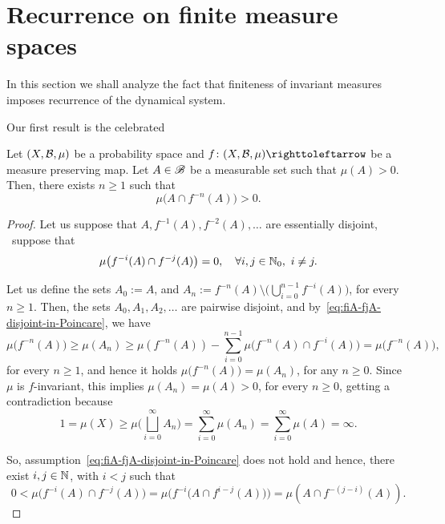 \section{Recurrence on finite measure spaces}\label{sec:recurrence-Poincare}

In this section we shall analyze the fact that finiteness of invariant measures imposes recurrence of the dynamical system.

Our first result is the celebrated

\begin{theorem}\label{thm:poincare-recurrence-v-return-sets-for-1-time}
  Let $(X,\mathcal{B},\mu)$ be a probability space and $f\colon (X,\mc{B},\mu)\carr$ be a measure preserving map. Let $A\in\mathscr{B}$ be a measurable set such that $\mu(A)>0$. Then, there exists $n\geq 1$ such that
  \begin{displaymath}
    \mu\big(A\cap f^{-n}(A)\big)>0.
  \end{displaymath}
\end{theorem}

\begin{proof}
  Let us suppose that $A,f^{-1}(A),f^{-2}(A),\ldots$ are essentially disjoint, \ie~suppose that
  \begin{equation}
    \label{eq:fiA-fjA-disjoint-in-Poincare}
    \mu\big(f^{-i}(A)\cap f^{-j}(A)\big)=0, \quad\forall i,j\in\N_{0},\ i\neq j.
  \end{equation}

  Let us define the sets $A_{0}:=A$, and $A_{n}:=f^{-n}(A)\setminus \Big(\bigcup_{i=0}^{n-1} f^{-i}(A)\Big)$, for every $n\geq 1$. Then, the sets $A_{0},A_{1},A_{2},\ldots$ are pairwise disjoint, and by~\eqref{eq:fiA-fjA-disjoint-in-Poincare}, we have
  \begin{displaymath}
    \mu\big(f^{-n}(A)\big)\geq \mu(A_{n})\geq \mu(f^{-n}(A)) - \sum_{i=0}^{n-1} \mu\big(f^{-n}(A)\cap f^{-i}(A)\big) = \mu\big(f^{-n}(A)\big),
  \end{displaymath}
  for every $n\geq 1$, and hence it holds $\mu\big(f^{-n}(A)\big)=\mu(A_{n})$, for any $n\geq 0$. Since $\mu$ is $f$-invariant, this implies $\mu(A_{n})=\mu(A)>0$, for every $n\geq 0$, getting a contradiction because
  \begin{displaymath}
    1=\mu(X)\geq\mu\bigg(\bigsqcup_{i=0}^{\infty} A_{n}\bigg) = \sum_{i=0}^{\infty} \mu(A_{n}) = \sum_{i=0}^{\infty} \mu(A) = \infty.
  \end{displaymath}

  So, assumption~\eqref{eq:fiA-fjA-disjoint-in-Poincare} does not hold and hence, there exist $i,j\in\mathbb{N}$, with $i<j$ such that
  \begin{displaymath}
    0<\mu\big(f^{-i}(A)\cap f^{-j}(A)\big) = \mu\Big(f^{-i}\big(A\cap f^{i-j}(A)\big)\Big) = \mu(A\cap f^{-(j-i)}(A)).
  \end{displaymath}
\end{proof}

